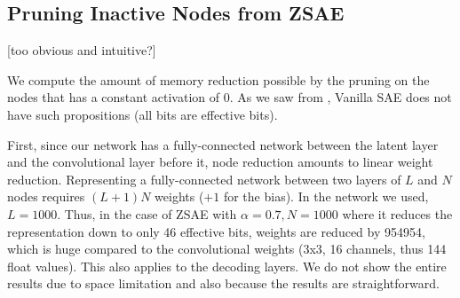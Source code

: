 \subsection{Pruning Inactive Nodes from ZSAE}

[too obvious and intuitive?]

We compute the amount of memory reduction possible by the pruning on the nodes
that has a constant activation of 0. As we saw from ,
Vanilla SAE does not have such propositions (all bits are effective bits).

First, since our network has a fully-connected network between the
latent layer and the convolutional layer before it, node reduction
amounts to linear weight reduction.  Representing a fully-connected
network between two layers of $L$ and $N$ nodes requires $(L+1)N$
weights ($+1$ for the bias).
In the network we used, $L=1000$. Thus, in the case of ZSAE with $\alpha=0.7, N=1000$
where it reduces the representation down to only 46 effective bits, weights are reduced by 954954,
which is huge compared to the convolutional weights (3x3, 16 channels, thus 144 float values).
This also applies to the decoding layers.
We do not show the entire results due to space limitation and also because the results are straightforward.


% 
% 

